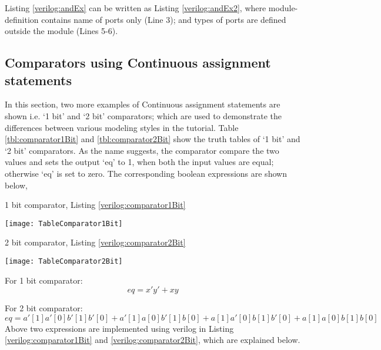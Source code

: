 Listing \ref{verilog:andEx} can be written as Listing \ref{verilog:andEx2}, where module-definition contains name of ports only (Line 3); and types of ports are defined outside the module (Lines 5-6). 


\subsection{Comparators using Continuous assignment statements}

In this section, two more examples of Continuous assignment statements are shown i.e. `1 bit' and `2 bit' comparators; which are used to demonstrate the differences between various modeling styles in the tutorial. Table \ref{tbl:comparator1Bit} and \ref{tbl:comparator2Bit} show the truth tables of `1 bit' and `2 bit' comparators.  As the name suggests, the comparator compare the two values and sets the output `eq' to 1, when both the input values are equal; otherwise `eq' is set to zero. The corresponding boolean expressions are shown below, 

\begin{table}[!h]
	\centering
	\caption{1 bit comparator, Listing \ref{verilog:comparator1Bit}}
	\texttt{[image: TableComparator1Bit]}
	\label{tbl:comparator1Bit}
\end{table}

\begin{table}[!h]
	\centering
	\caption{2 bit comparator, Listing \ref{verilog:comparator2Bit}}
	\texttt{[image: TableComparator2Bit]}
	\label{tbl:comparator2Bit}
\end{table}

For 1 bit comparator: 
\begin{equation}
eq = x' y' + x y
\label{eq:1bitComparator}
\end{equation} 

For 2 bit comparator: 
\begin{equation}
eq = a'[1]a'[0]b'[1]b'[0] + a'[1]a[0]b'[1]b[0] + a[1]a'[0]b[1]b'[0] + a[1]a[0]b[1]b[0]
\label{eq:2bitComparator}
\end{equation} 
Above two expressions are implemented using verilog in Listing \ref{verilog:comparator1Bit} and \ref{verilog:comparator2Bit}, which are explained below.

